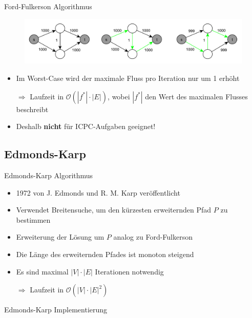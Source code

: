 \documentclass[18pt]{beamer}
\begin{document}
\begin{frame}{Ford-Fulkerson Algorithmus}
\begin{figure}
\includegraphics[width = \textwidth]{img/Jakob_Ford3.pdf}
\end{figure}
\begin{itemize}
	\item Im Worst-Case wird der maximale Fluss pro Iteration nur um 1 erh\"oht
	\item[$\Rightarrow$]  Laufzeit in $\mathcal O(|f^*|\cdot |E|)$, wobei $|f^*|$ den Wert des maximalen Flusses beschreibt
	\item Deshalb \textbf{nicht} f\"ur ICPC-Aufgaben geeignet!
\end{itemize}
\end{frame}

\subsection{Edmonds-Karp}
\begin{frame}{Edmonds-Karp Algorithmus}
\begin{itemize}
\item 1972 von J. Edmonds und R. M. Karp ver\"offentlicht
\item Verwendet Breitensuche, um den k\"urzesten erweiternden Pfad $P$ zu bestimmen
\item Erweiterung der L\"osung um $P$ analog zu Ford-Fulkerson
\item Die L\"ange des erweiternden Pfades ist monoton steigend
\item Es sind maximal $|V|\cdot |E|$ Iterationen notwendig
\item[$\Rightarrow$] Laufzeit in $\mathcal O(|V| \cdot |E|^2)$
\end{itemize}
\end{frame}

\begin{frame}{Edmonds-Karp Implementierung}
\SetEndCharOfAlgoLine{}
\begin{algorithm}[H]
	\caption{Edmonds-Karp}
\end{algorithm}
\end{frame}
\end{document}
